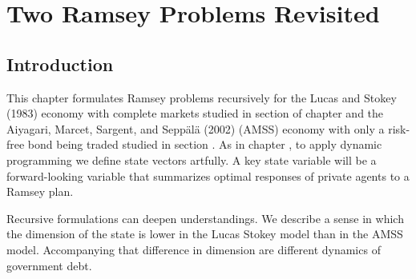 
%


\showchaptIDtrue
\def\@chaptID{12.}



\def\toone{{t+1}}
\def\ttwo{{t+2}}
\def\tthree{{t+3}}
\def\Tone{{T+1}}
\def\TTT{{T-1}}
\def\rtr{{\rm tr}}
\chapter{Two  Ramsey Problems Revisited}\label{optaxrecur}
%
\medskip
\section{Introduction}\label{Ramsey_appa1}%
This chapter formulates    Ramsey problems recursively for  the Lucas and Stokey (1983) economy with complete markets
  studied in section   of chapter   and the Aiyagari, Marcet, Sargent, and Sepp\"al\"a (2002) (AMSS)
economy  with only a risk-free bond being traded studied in section . As in chapter , to apply dynamic programming
we   define  state vectors artfully. A key state variable will be a   forward-looking variable that summarizes
optimal responses of private agents to a Ramsey plan.
%
%

Recursive formulations can  deepen  understandings. We describe  a sense in which
the dimension of the state is lower in the Lucas Stokey model than in the AMSS model.  Accompanying that difference in dimension are  different dynamics of government debt.


